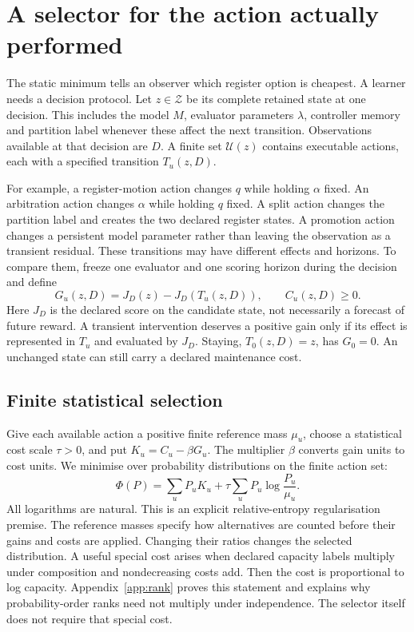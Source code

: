 \section{A selector for the action actually performed}
\label{sec:self-consistent-loss-geometry}

The static minimum tells an observer which register option is cheapest. A learner needs a decision protocol. Let \(z\in\mathcal Z\) be its complete retained state at one decision. This includes the model \(M\), evaluator parameters \(\lambda\), controller memory and partition label whenever these affect the next transition. Observations available at that decision are \(D\). A finite set \(\mathcal U(z)\) contains executable actions, each with a specified transition \(T_u(z,D)\).

For example, a register-motion action changes \(q\) while holding \(\alpha\) fixed. An arbitration action changes \(\alpha\) while holding \(q\) fixed. A split action changes the partition label and creates the two declared register states. A promotion action changes a persistent model parameter rather than leaving the observation as a transient residual. These transitions may have different effects and horizons. To compare them, freeze one evaluator and one scoring horizon during the decision and define
\begin{equation}
 G_u(z,D)=J_D(z)-J_D(T_u(z,D)),\qquad C_u(z,D)\geq0 .
 \label{eq:actual-gain}
\end{equation}
Here \(J_D\) is the declared score on the candidate state, not necessarily a forecast of future reward. A transient intervention deserves a positive gain only if its effect is represented in \(T_u\) and evaluated by \(J_D\). Staying, \(T_0(z,D)=z\), has \(G_0=0\). An unchanged state can still carry a declared maintenance cost.

\subsection{Finite statistical selection}

Give each available action a positive finite reference mass \(\mu_u\), choose a statistical cost scale \(\tau>0\), and put
\(K_u=C_u-\beta G_u\). The multiplier \(\beta\) converts gain units to cost units. We minimise over probability distributions on the finite action set:
\begin{equation}
 \Phi(P)=\sum_uP_uK_u+
       \tau\sum_uP_u\log\frac{P_u}{\mu_u}.
 \label{eq:selector-objective}
\end{equation}
All logarithms are natural. This is an explicit relative-entropy regularisation premise. The reference masses specify how alternatives are counted before their gains and costs are applied. Changing their ratios changes the selected distribution. A useful special cost arises when declared capacity labels multiply under composition and nondecreasing costs add. Then the cost is proportional to log capacity. Appendix~\ref{app:rank} proves this statement and explains why probability-order ranks need not multiply under independence. The selector itself does not require that special cost.

